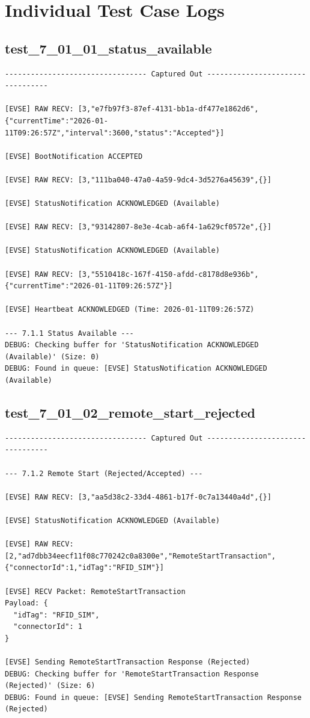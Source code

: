 \documentclass{article}
\begin{document}
\section{Individual Test Case Logs}\subsection*{test\_7\_01\_01\_status\_available}
\begin{lstlisting}
--------------------------------- Captured Out ---------------------------------

[EVSE] RAW RECV: [3,"e7fb97f3-87ef-4131-bb1a-df477e1862d6",{"currentTime":"2026-01-11T09:26:57Z","interval":3600,"status":"Accepted"}]

[EVSE] BootNotification ACCEPTED

[EVSE] RAW RECV: [3,"111ba040-47a0-4a59-9dc4-3d5276a45639",{}]

[EVSE] StatusNotification ACKNOWLEDGED (Available)

[EVSE] RAW RECV: [3,"93142807-8e3e-4cab-a6f4-1a629cf0572e",{}]

[EVSE] StatusNotification ACKNOWLEDGED (Available)

[EVSE] RAW RECV: [3,"5510418c-167f-4150-afdd-c8178d8e936b",{"currentTime":"2026-01-11T09:26:57Z"}]

[EVSE] Heartbeat ACKNOWLEDGED (Time: 2026-01-11T09:26:57Z)

--- 7.1.1 Status Available ---
DEBUG: Checking buffer for 'StatusNotification ACKNOWLEDGED (Available)' (Size: 0)
DEBUG: Found in queue: [EVSE] StatusNotification ACKNOWLEDGED (Available)
\end{lstlisting}
\subsection*{test\_7\_01\_02\_remote\_start\_rejected}
\begin{lstlisting}
--------------------------------- Captured Out ---------------------------------

--- 7.1.2 Remote Start (Rejected/Accepted) ---

[EVSE] RAW RECV: [3,"aa5d38c2-33d4-4861-b17f-0c7a13440a4d",{}]

[EVSE] StatusNotification ACKNOWLEDGED (Available)

[EVSE] RAW RECV: [2,"ad7dbb34eecf11f08c770242c0a8300e","RemoteStartTransaction",{"connectorId":1,"idTag":"RFID_SIM"}]

[EVSE] RECV Packet: RemoteStartTransaction
Payload: {
  "idTag": "RFID_SIM",
  "connectorId": 1
}

[EVSE] Sending RemoteStartTransaction Response (Rejected)
DEBUG: Checking buffer for 'RemoteStartTransaction Response (Rejected)' (Size: 6)
DEBUG: Found in queue: [EVSE] Sending RemoteStartTransaction Response (Rejected)
\end{lstlisting}
\end{document}

